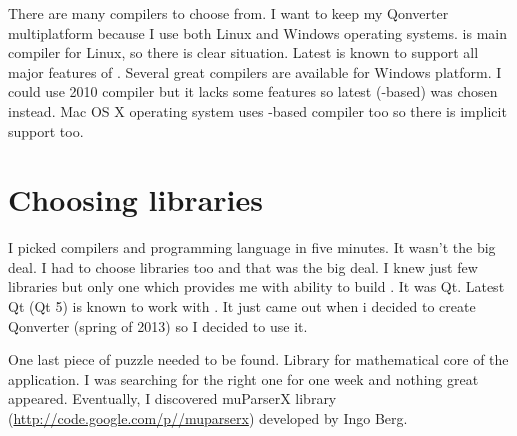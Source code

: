 There are many \cpp compilers to choose from. I want to keep my Qonverter multiplatform because I use both Linux and Windows operating systems.  is main compiler for Linux, so there is clear situation. Latest  is known to support all major features of . Several great compilers are available for Windows platform. I could use  2010 compiler but it lacks some  features so latest  (-based) was chosen instead. Mac OS X operating system uses -based compiler too so there is implicit support too.

\section{Choosing libraries}
I picked compilers and  programming language in five minutes. It wasn't the big deal. I had to choose libraries too and that was the big deal. I knew just few libraries but only one which provides me with ability to build . It was Qt. Latest Qt (Qt 5) is known to work with . It just came out when i decided to create Qonverter (spring of 2013) so I decided to use it.

One last piece of puzzle needed to be found. Library for mathematical core of the application. I was searching for the right one for one week and nothing great appeared. Eventually, I discovered muParserX library (\href{http://code.google.com/p/muparserx}{http://code.google.com/p/\-/muparserx}) developed by Ingo Berg.
